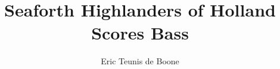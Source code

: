 \documentclass{tex/score_book}
\title{Seaforth Highlanders of Holland\\Scores Bass}
\author{Eric Teunis de Boone}
\begin{document}


\newpage
\cleardoublepage
{}
{}
\begin{multicols}{2}
  \tableofcontents
\end{multicols}

%
\newpage

\end{document}
